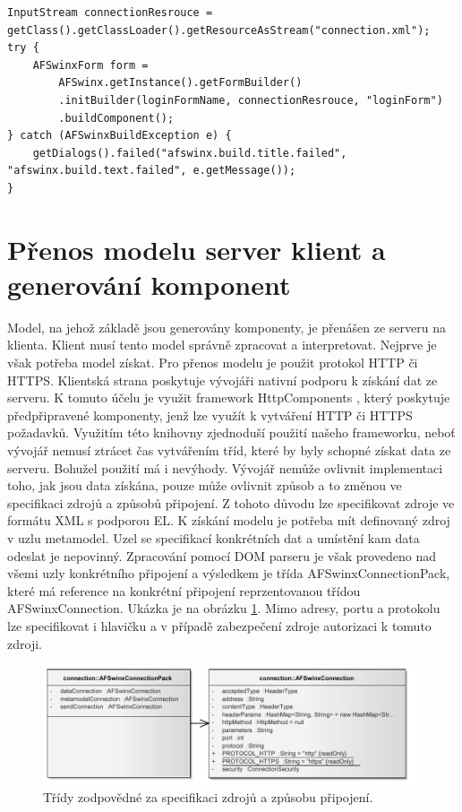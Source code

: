 \begin{lstlisting}[caption={Generování formuláře na klientovi},
label={code:formGeneration}]
InputStream connectionResrouce = getClass().getClassLoader().getResourceAsStream("connection.xml");
try {
	AFSwinxForm form =
		AFSwinx.getInstance().getFormBuilder()
		.initBuilder(loginFormName, connectionResrouce, "loginForm")
		.buildComponent();
} catch (AFSwinxBuildException e) {
	getDialogs().failed("afswinx.build.title.failed", "afswinx.build.text.failed", e.getMessage());
}
\end{lstlisting}

\section{Přenos modelu server klient a generování komponent}
Model, na jehož základě jsou generovány komponenty, je přenášen ze serveru na klienta. Klient musí tento model správně zpracovat a interpretovat. Nejprve je však potřeba model získat. Pro přenos modelu je použit protokol HTTP či HTTPS. Klientská strana poskytuje vývojáři nativní podporu k získání dat ze serveru. K tomuto účelu je využit framework HttpComponents \cite{apacheHttp}, který poskytuje předpřipravené komponenty, jenž lze využít k vytváření HTTP či HTTPS požadavků. Využitím této knihovny zjednoduší použití našeho frameworku, neboť vývojář nemusí ztrácet čas vytvářením tříd, které by byly schopné získat data ze serveru. Bohužel použití má i nevýhody. Vývojář nemůže ovlivnit implementaci toho, jak jsou data získána, pouze může ovlivnit způsob a to změnou ve specifikaci zdrojů a způsobů připojení. Z tohoto důvodu lze specifikovat zdroje ve formátu XML s podporou EL. K získání modelu je potřeba mít definovaný zdroj v uzlu metamodel. Uzel se specifikací konkrétních dat a umístění kam data odeslat je nepovinný. Zpracování pomocí DOM parseru je však provedeno nad všemi uzly konkrétního připojení a výsledkem je třída AFSwinxConnectionPack, které má reference na konkrétní připojení reprzentovanou třídou AFSwinxConnection. Ukázka je na obrázku \ref{img:connectionPack}. Mimo adresy, portu a protokolu lze specifikovat i hlavičku a v případě zabezpečení zdroje autorizaci k tomuto zdroji.

\begin{figure}[h!]
\includegraphics{images/connectionPack}
\caption{Třídy zodpovědné za specifikaci zdrojů a způsobu připojení.}
\label{img:connectionPack}
\end{figure}

